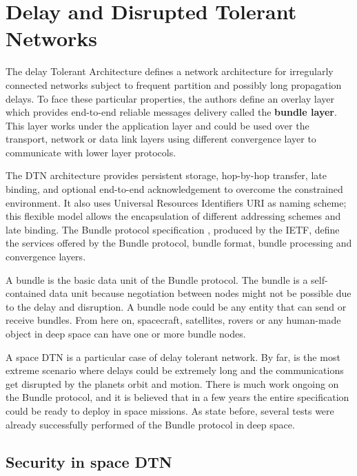 
\section{Delay and Disrupted Tolerant Networks}

The delay Tolerant Architecture \cite{cerf2007delay} defines a network architecture for irregularly connected networks subject to frequent partition and possibly long propagation delays. To face these particular properties, the authors define an overlay layer which provides end-to-end reliable messages delivery called the \textbf{bundle layer}. This layer works under the application layer and could be used over the transport, network or data link layers using different convergence layer to communicate with lower layer protocols. 

The DTN architecture provides persistent storage, hop-by-hop transfer, late binding, and optional end-to-end acknowledgement to overcome the constrained environment. It also uses Universal Resources Identifiers URI  as naming scheme; this flexible model allows the encapsulation of different addressing schemes and late binding. The Bundle protocol specification \cite{rfc5050}, produced by the IETF,  define the services offered by the Bundle protocol, bundle format, bundle processing and convergence layers. 

A bundle is the basic data unit of the Bundle protocol. The bundle is a self-contained data unit because negotiation between nodes might not be possible due to the delay and disruption. A bundle node could be any entity that can send or receive bundles. From here on, spacecraft, satellites, rovers or any human-made object in deep space can have one or more bundle nodes. 

A space DTN is a particular case of delay tolerant network. By far, is the most extreme scenario where delays could be extremely long and the communications get disrupted by the planets orbit and motion. There is much work ongoing on the Bundle protocol, and it is believed that in a few years the entire specification could be ready to deploy in space missions. As state before, several tests were already successfully performed of the Bundle protocol in deep space.





\subsection{Security in space DTN}


